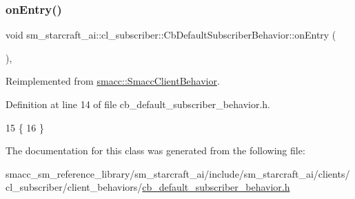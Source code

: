 \subsubsection{\texorpdfstring{on\+Entry()}{onEntry()}}
{\footnotesize\ttfamily void sm\+\_\+starcraft\+\_\+ai\+::cl\+\_\+subscriber\+::\+Cb\+Default\+Subscriber\+Behavior\+::on\+Entry (\begin{DoxyParamCaption}{ }\end{DoxyParamCaption})\hspace{0.3cm}{\ttfamily [inline]}, {\ttfamily [virtual]}}



Reimplemented from \hyperlink{classsmacc_1_1SmaccClientBehavior_ad5d3e1f1697c3cfe66c94cadba948493}{smacc\+::\+Smacc\+Client\+Behavior}.



Definition at line 14 of file cb\+\_\+default\+\_\+subscriber\+\_\+behavior.\+h.


\begin{DoxyCode}
15     \{
16     \}
\end{DoxyCode}


The documentation for this class was generated from the following file\+:\begin{DoxyCompactItemize}
\item 
smacc\+\_\+sm\+\_\+reference\+\_\+library/sm\+\_\+starcraft\+\_\+ai/include/sm\+\_\+starcraft\+\_\+ai/clients/cl\+\_\+subscriber/client\+\_\+behaviors/\hyperlink{sm__starcraft__ai_2include_2sm__starcraft__ai_2clients_2cl__subscriber_2client__behaviors_2cb__default__subscriber__behavior_8h}{cb\+\_\+default\+\_\+subscriber\+\_\+behavior.\+h}\end{DoxyCompactItemize}
